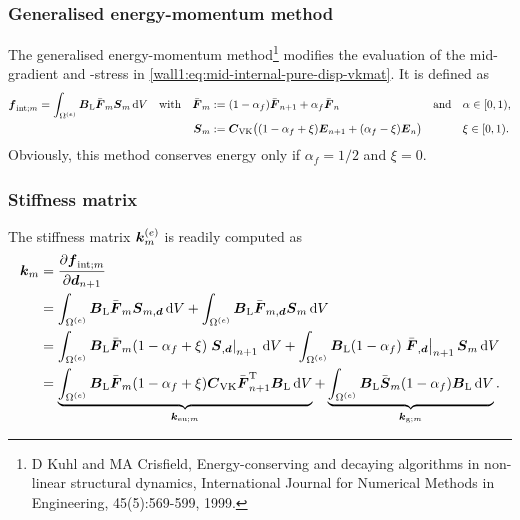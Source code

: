 \subsubsection{Generalised energy-momentum method}
The generalised energy-momentum method\footnote{D Kuhl and MA Crisfield,
Energy-conserving and decaying algorithms in non-linear structural dynamics,
International Journal for Numerical Methods in Engineering, 45(5):569-599,
1999.} modifies the evaluation of the mid-gradient and -stress in
\eqref{wall1:eq:mid-internal-pure-disp-vkmat}. It is defined as
\begin{equation}
\begin{aligned}
   \boldsymbol{f}_{\text{int};m}
&  = \int_{\Omega^{(e)}}
     \boldsymbol{B}_{\text{L}}
     {\bar{\boldsymbol{F}}_m}
     {\boldsymbol{S}_m}
     \, \mathrm{d} V
&& \text{with}
&  \bar{\boldsymbol{F}}_m
&  := (1-\alpha_f) \bar{\boldsymbol{F}}_{n+1} + \alpha_f \bar{\boldsymbol{F}}_n
&& \text{and}
&&  \alpha\in[0,1)
   \text{,}
\\
&
&&
&  \boldsymbol{S}_m
&  := \boldsymbol{C}_{\text{VK}} \big( (1-\alpha_f+\xi)\boldsymbol{E}_{n+1} +
(\alpha_f-\xi)\boldsymbol{E}_{n} \big)
&&
&& \xi\in[0,1)
   \text{.}
\end{aligned}
\end{equation}
Obviously, this method conserves energy only if $\alpha_f=1/2$ and $\xi=0$.
  

\subsubsection{Stiffness matrix}
The stiffness matrix $\boldsymbol{k}^{(e)}_m$ is readily computed as
\begin{equation}
\begin{aligned}
   \boldsymbol{k}_m
&  = \frac{\partial \boldsymbol{f}_{\text{int};m}}{\partial \boldsymbol{d}_{n+1}}
\\
&  = \int_{\Omega^{(e)}}
   \boldsymbol{B}_{\text{L}} \bar{\boldsymbol{F}}_m \boldsymbol{S}_{m,\boldsymbol{d}}
   \, \mathrm{d} V
   + \int_{\Omega^{(e)}}
   \boldsymbol{B}_{\text{L}} \bar{\boldsymbol{F}}_{m,\boldsymbol{d}} \boldsymbol{S}_{m}
   \, \mathrm{d} V
\\
&  = \int_{\Omega^{(e)}}
   \boldsymbol{B}_{\text{L}} \bar{\boldsymbol{F}}_m (1-\alpha_f+\xi)\left.\boldsymbol{S}_{,\boldsymbol{d}}\right|_{n+1}
   \, \mathrm{d} V
   + \int_{\Omega^{(e)}}
   \boldsymbol{B}_{\text{L}} (1-\alpha_f)\left.\bar{\boldsymbol{F}}_{,\boldsymbol{d}}\right|_{n+1} \boldsymbol{S}_{m}
   \, \mathrm{d} V
\\
&  = \underbrace{\int_{\Omega^{(e)}}
   \boldsymbol{B}_{\text{L}} \bar{\boldsymbol{F}}_m (1-\alpha_f+\xi) \boldsymbol{C}_{\text{VK}} \bar{\boldsymbol{F}}_{n+1}^{\mathrm{T}} \boldsymbol{B}_{\text{L}}
   \, \mathrm{d} V}_{\boldsymbol{k}_{\text{e}\text{u};m}}
   + \underbrace{\int_{\Omega^{(e)}}
   \boldsymbol{B}_{\text{L}} \bar{\boldsymbol{S}}_{m} (1-\alpha_f)\boldsymbol{B}_{\text{L}}
   \, \mathrm{d} V}_{\boldsymbol{k}_{\text{g};m}}
   \text{.}
\end{aligned}
\end{equation}

